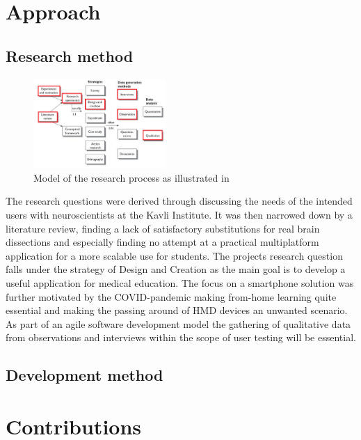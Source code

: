 \section{Approach}


\subsection*{Research method}

\begin{figure}
    \begin{center}
        \includegraphics[width=0.45\textwidth]{fig/researchplan_image}
    \end{center}
    \caption{Model of the research process as illustrated in \citep{oates2006} }
    \label{researchplan_img}
\end{figure}

The research questions were derived through discussing the needs of the intended users with neuroscientists at the Kavli Institute. It was then narrowed down by a literature review, finding a lack of satisfactory substitutions for real brain dissections and especially finding no attempt at a practical multiplatform application for a more scalable use for students. The projects research question falls under the strategy of Design and Creation as the main goal is to develop a useful application for medical education. The focus on a smartphone solution was further motivated by the COVID-pandemic making from-home learning quite essential and making the passing around of HMD devices an unwanted scenario. As part of an agile software development model the gathering of qualitative data from observations and interviews within the scope of user testing will be essential. 

\subsection*{Development method}

\section{Contributions}

